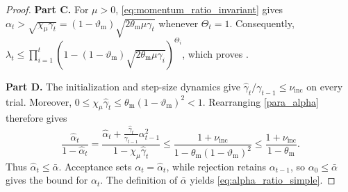 \documentclass{article}
\begin{document}
\begin{proof}
\medskip
\noindent\textbf{Part C.}
For \(\mu>0\), \eqref{eq:momentum_ratio_invariant} gives
$\alpha_t
>
\sqrt{\chi_\mu\gamma_t}
=
(1-\vartheta_{\mathrm{m}})\sqrt{2\theta_{\mathrm{m}}\mu\gamma_t}$
whenever $\Theta_t=1$. 
Consequently,
$\lambda_t
\le
\prod_{i=1}^t
\left(
1-(1-\vartheta_{\mathrm{m}})
\sqrt{2\theta_{\mathrm{m}}\mu\gamma_i}
\right)^{\Theta_i}$, 
which proves .

\medskip
\noindent\textbf{Part D.}
The initialization and step-size dynamics give
\(\hat\gamma_t/\gamma_{t-1}\le\nu_{\mathrm{inc}}\) on every trial.
Moreover, \(0\le\chi_\mu\hat\gamma_t
\le\theta_{\mathrm{m}}(1-\vartheta_{\mathrm{m}})^2<1\).
Rearranging \eqref{para_alpha} therefore gives
\[
\frac{\hat\alpha_t}{1-\hat\alpha_t}
=
\frac{
\hat\alpha_t+\frac{\hat\gamma_t}{\gamma_{t-1}}\alpha_{t-1}^2
}{
1-\chi_\mu\hat\gamma_t
}
\le
\frac{1+\nu_{\mathrm{inc}}}
{1-\theta_{\mathrm{m}}(1-\vartheta_{\mathrm{m}})^2}
\le
\frac{1+\nu_{\mathrm{inc}}}{1-\theta_{\mathrm{m}}}.
\]
Thus \(\hat\alpha_t\le\bar\alpha\). Acceptance sets
\(\alpha_t=\hat\alpha_t\), while rejection retains \(\alpha_{t-1}\),
so \(\alpha_0\le\bar\alpha\) gives the bound for \(\alpha_t\).
The definition of \(\bar\alpha\) yields \eqref{eq:alpha_ratio_simple}.


\end{proof}
\end{document}

